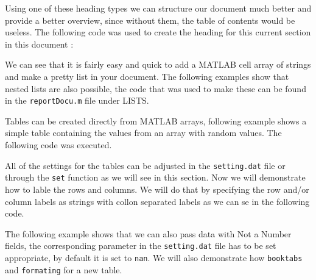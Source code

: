 
Using one of these heading types we can structure our document much better and provide a better overview, since
without them, the table of contents would be useless. The following code was used to create the heading for this
current section in this document :


We can see that it is fairly easy and quick to add a MATLAB cell array of strings and make a pretty list in 
your document. The following examples show that nested lists are also possible, the code that was used to make these 
can be found in the {\tt reportDocu.m} file under LISTS. 


Tables can be created directly from MATLAB arrays, following example shows a simple table containing the values 
from an array with random values. The following code was executed.


All of the settings for the tables can be adjusted in the {\tt setting.dat} file or through the {\tt set} 
function as we will see in this section. Now we will demonstrate how to lable the rows and columns. We will
do that by specifying the row and/or column labels as strings with collon separated labels as we can se in 
the following code. 


The following example shows that we can also pass data with Not a Number fields, the corresponding parameter 
in the {\tt setting.dat} file has to be set appropriate, by default it is set to {\tt nan}. We will also demonstrate 
how {\tt booktabs} and {\tt formating} for a new table.











